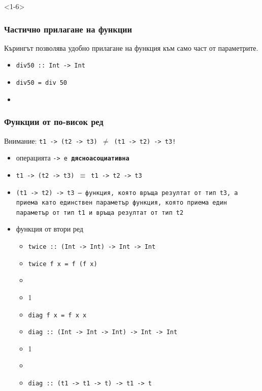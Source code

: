 \documentclass{beamer}
\begin{document}
\begin{frame}<1-6>
  \frametitle{Частично прилагане на функции}
  Кърингът позволява удобно прилагане на функция към само част от параметрите.
  \begin{itemize}[<+->]
  \item \tt{div50 :: Int -> Int}
  \item \tt{div50\temporal<4>{ x}{ $\not{\tt x}$}{} = div 50}
  \item {}
  \end{itemize}
\end{frame}

\begin{frame}
  \frametitle{Функции от по-висок ред}
  \alert{Внимание:} \tt{t1 -> (t2 -> t3)} $\neq$ \tt{(t1 -> t2) -> t3}!\pause
  \begin{itemize}[<+->]
  \item операцията \tt{->} е \textbf{дясноасоциативна}
  \item \tt{t1 -> (t2 -> t3)} $\equiv$ \tt{t1 -> t2 -> t3}
  \item \tt{(t1 -> t2) -> t3} --- функция, която връща резултат от тип \tt{t3}, а приема като единствен параметър функция, която приема един параметър от тип \tt{t1} и връща резултат от тип \tt{t2}
  \item \alert{функция от втори ред}
    \begin{itemize}
    \item \tt{twice :: (Int -> Int) -> Int -> Int}
    \item \tt{twice f x = f (f x)}
    \item {}
    \item {}1
    \item \tt{diag f x = f x x}
    \item \tt{diag :: (Int -> Int -> Int) -> Int -> Int}
    \item {}1
    \item {}
    \item \tt{diag :: (t1 -> t1 -> t) -> t1 -> t}
    \end{itemize}
  \end{itemize}
\end{frame}
\end{document}
